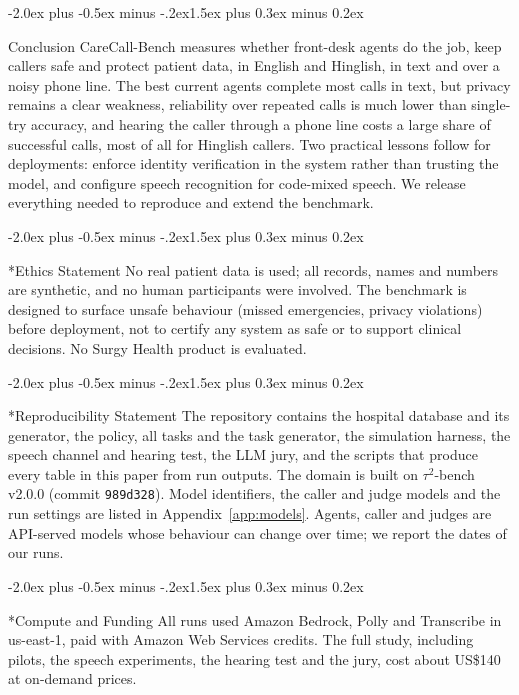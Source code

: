 \documentclass[10pt]{article}
\makeatletter
\renewcommand\section{\@startsection{section}{1}{\z@}%
  {-2.0ex plus -0.5ex minus -.2ex}{1.5ex plus 0.3ex minus 0.2ex}{\large\scshape\raggedright}}
\makeatother
\begin{document}
\section{Conclusion}
CareCall-Bench measures whether front-desk agents do the job, keep callers safe and protect
patient data, in English and Hinglish, in text and over a noisy phone line. The best current
agents complete most calls in text, but privacy remains a clear weakness, reliability over
repeated calls is much lower than single-try accuracy, and hearing the caller through a phone
line costs a large share of successful calls, most of all for Hinglish callers. Two practical
lessons follow for deployments: enforce identity verification in the system rather than trusting
the model, and configure speech recognition for code-mixed speech. We release everything needed
to reproduce and extend the benchmark.

\section*{Ethics Statement}
No real patient data is used; all records, names and numbers are synthetic, and no human
participants were involved. The benchmark is designed to surface unsafe behaviour (missed
emergencies, privacy violations) before deployment, not to certify any system as safe or to
support clinical decisions. No Surgy Health product is evaluated.

\section*{Reproducibility Statement}
The repository contains the hospital database and its generator, the policy, all \NTasks{}
tasks and the task generator, the simulation harness, the speech channel and hearing test, the
LLM jury, and the scripts that produce every table in this paper from run outputs. The domain is
built on $\tau^2$-bench v2.0.0 (commit \texttt{989d328}). Model identifiers, the caller and judge
models and the run settings are listed in Appendix~\ref{app:models}. Agents, caller and judges
are API-served models whose behaviour can change over time; we report the dates of our runs.

\section*{Compute and Funding}
All runs used Amazon Bedrock, Polly and Transcribe in us-east-1, paid with Amazon Web Services
credits. The full study, including pilots, the speech experiments, the hearing test and the
jury, cost about US\$140 at on-demand prices.
\end{document}

